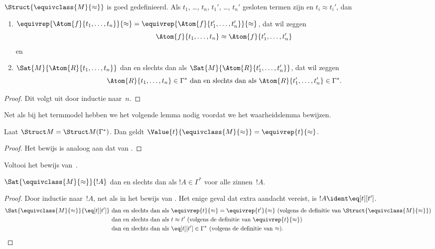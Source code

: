 \documentclass[openany]{memoir}
\begin{document}
\begin{prop}
$\Struct{\equivclass{M}{\approx}}$ is goed gedefinieerd. Als $t_1$,
  \dots, $t_n$, $t_1'$, \dots, $t_n'$ gesloten termen zijn en
  $t_i \approx t_i'$, dan
\begin{enumerate}
\item $\equivrep{\Atom{f}{t_1,\dots, t_n}}{\approx} =
    \equivrep{\Atom{f}{t_1',\dots, t_n'}}{\approx}$, dat wil zeggen
  \[
  \Atom{f}{t_1,\dots, t_n} \approx \Atom{f}{t_1',\dots, t_n'}
  \]
  en
\item $\Sat{M}{\Atom{R}{t_1,\dots, t_n}}$ dan en slechts dan als
  $\Sat{M}{\Atom{R}{t_1',\dots, t_n'}}$, dat wil zeggen
  \[
    \Atom{R}{t_1,\dots, t_n} \in \Gamma^* \text{ dan en slechts dan als }
    \Atom{R}{t_1',\dots, t_n'} \in \Gamma^*.
  \]
\end{enumerate}
\end{prop}

\begin{proof}
Dit volgt uit  door inductie naar~$n$.
\end{proof}

Net als bij het termmodel hebben we het volgende lemma nodig voordat we het
waarheidslemma bewijzen.

\begin{lem} 
 Laat $\Struct M = \Struct M
 (\Gamma^*)$. Dan geldt $\Value{t}{\equivclass{M}{\approx}} = \equivrep{t}
 {\approx}$.
\end{lem}
\begin{proof} 
Het bewijs is analoog aan dat van .
\end{proof}

\begin{prob}
Voltooi het bewijs van~.
\end{prob}

\begin{lem}
$\Sat{\equivclass{M}{\approx}}{!A}$ dan en slechts dan als
$!A \in \Gamma^*$ voor alle zinnen~$!A$.
\end{lem}

\begin{proof}
Door inductie naar~$!A$, net als in het bewijs van
. Het enige geval dat extra aandacht vereist, is
$!A \ident \eq[t][t']$.
\begin{align*}
\Sat{\equivclass{M}{\approx}}{\eq[t][t']} & \text{ dan en slechts dan als } \equivrep{t}{\approx} = \equivrep{t'}{\approx}
\text{ (volgens de definitie van $\Struct{\equivclass{M}{\approx}}$)}\\
& \text{ dan en slechts dan als } t \approx t' \text{ (volgens de definitie van $\equivrep{t}{\approx}$)}\\
& \text{ dan en slechts dan als } \eq[t][t'] \in \Gamma^* \text{ (volgens de definitie van $\approx$).}
\end{align*}
\end{proof}
\end{document}

